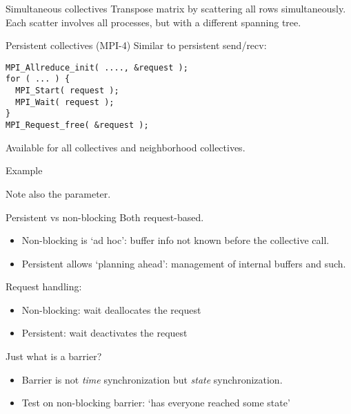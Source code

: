 \begin{numberedframe}{Simultaneous collectives}
  Transpose matrix by scattering all rows simultaneously.\\
  Each scatter involves all processes, but with a
  different spanning tree.

\end{numberedframe}


\begin{numberedframe}{Persistent collectives (MPI-4)}
  Similar to persistent send/recv:
\begin{lstlisting}
MPI_Allreduce_init( ...., &request );
for ( ... ) {
  MPI_Start( request );
  MPI_Wait( request );
}
MPI_Request_free( &request );
\end{lstlisting}
Available for all collectives and neighborhood collectives.
\end{numberedframe}

\begin{numberedframe}{Example}

  Note also the  parameter.
\end{numberedframe}

\begin{numberedframe}{Persistent vs non-blocking}
  Both request-based.
  \begin{itemize}
  \item Non-blocking is `ad hoc': buffer info not known before the collective call.
  \item Persistent allows `planning ahead': management of internal buffers and such.
  \end{itemize}
  Request handling:
  \begin{itemize}
  \item Non-blocking: wait deallocates the request
  \item Persistent: wait deactivates the request
  \end{itemize}
\end{numberedframe}


\begin{numberedframe}{Just what is a barrier?}
  \begin{itemize}
  \item Barrier is not \emph{time} synchronization but \emph{state}
    synchronization.
  \item Test on non-blocking barrier: `has everyone reached some
    state'
  \end{itemize}
\end{numberedframe}

